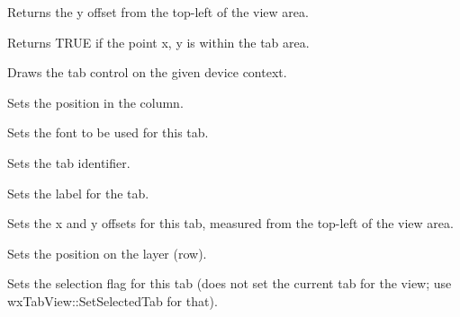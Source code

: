 
Returns the y offset from the top-left of the view area.



Returns TRUE if the point x, y is within the tab area.



Draws the tab control on the given device context.



Sets the position in the column.



Sets the font to be used for this tab.



Sets the tab identifier.



Sets the label for the tab.



Sets the x and y offsets for this tab, measured from the top-left of the view area.



Sets the position on the layer (row).



Sets the selection flag for this tab (does not set the current tab for the view;
use wxTabView::SetSelectedTab for that).


